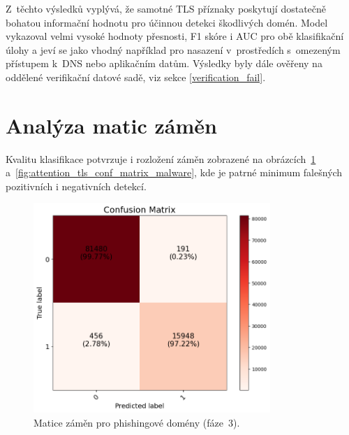 Z~těchto výsledků vyplývá, že samotné TLS příznaky poskytují dostatečně bohatou informační hodnotu pro účinnou detekci škodlivých domén. Model vykazoval velmi vysoké hodnoty přesnosti, F1 skóre i AUC pro obě klasifikační úlohy a jeví se jako vhodný například pro nasazení v~prostředích s~omezeným přístupem k~DNS nebo aplikačním datům. Výsledky byly dále ověřeny na oddělené verifikační datové sadě, viz sekce \ref{verification_fail}.

\section*{Analýza matic záměn}

Kvalitu klasifikace potvrzuje i rozložení záměn zobrazené na obrázcích~\ref{fig:attention_tls_conf_matrix_phishing} a~\ref{fig:attention_tls_conf_matrix_malware}, kde je patrné minimum falešných pozitivních i negativních detekcí.

\begin{figure}[H]
    \centering
    \includegraphics[width=0.8\textwidth]{obrazky-figures/attention_tls_stage_3_phishing_v1.1_confusion_matrix.png}
    \caption{Matice záměn pro phishingové domény (fáze~3).}
    \label{fig:attention_tls_conf_matrix_phishing}
\end{figure}

